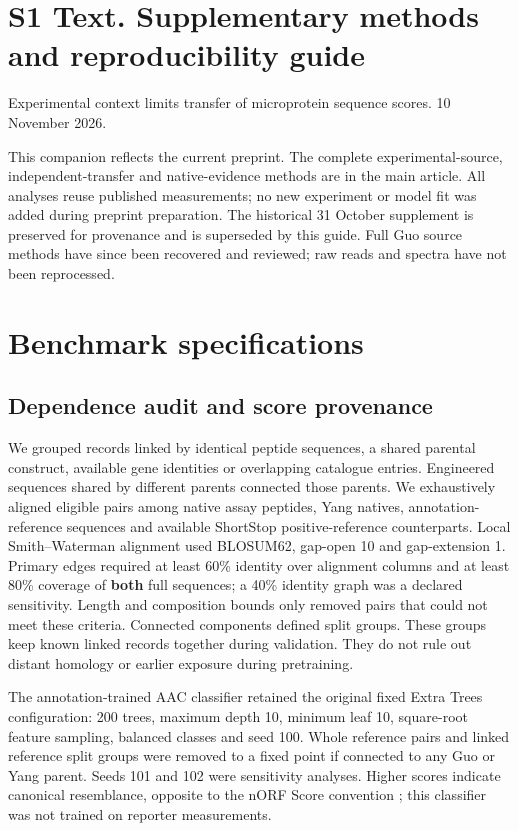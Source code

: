 \documentclass[11pt,a4paper]{article}
\begin{document}
\section*{S1 Text. Supplementary methods and reproducibility guide}
Experimental context limits transfer of microprotein sequence scores. 10 November 2026.

This companion reflects the current preprint. The complete experimental-source, independent-transfer and native-evidence methods are in the main article. All analyses reuse published measurements; no new experiment or model fit was added during preprint preparation. The historical 31 October supplement is preserved for provenance and is superseded by this guide. Full Guo source methods have since been recovered and reviewed; raw reads and spectra have not been reprocessed.

\section{Benchmark specifications}
\subsection{Dependence audit and score provenance}
We grouped records linked by identical peptide sequences, a shared parental construct, available gene identities or overlapping catalogue entries. Engineered sequences
shared by different parents connected those parents. We exhaustively aligned
eligible pairs among native assay peptides, Yang natives, annotation-reference
sequences and available ShortStop positive-reference counterparts. Local
Smith--Waterman alignment used BLOSUM62, gap-open 10 and gap-extension 1.
Primary edges required at least 60\% identity over alignment columns and at
least 80\% coverage of \textbf{both} full sequences; a 40\% identity graph was a
declared sensitivity. Length and composition bounds only removed pairs that
could not meet these criteria. Connected components defined split groups.
These groups keep known linked records together during validation. They do not rule out distant homology or earlier exposure during pretraining.

The annotation-trained AAC classifier retained the original fixed Extra Trees
configuration: 200 trees, maximum depth 10, minimum leaf 10, square-root
feature sampling, balanced classes and seed 100. Whole reference pairs and
linked reference split groups were removed to a fixed point if connected to
any Guo or Yang parent. Seeds 101 and 102 were sensitivity analyses. Higher
scores indicate canonical resemblance, opposite to the nORF Score convention \cite{gounder};
this classifier was not trained on reporter measurements.
\end{document}

